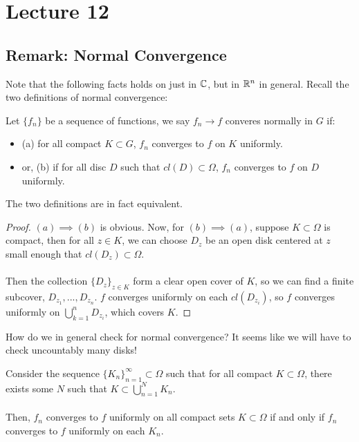 \section{Lecture 12}
\subsection{Remark: Normal Convergence}

Note that the following facts holds on just in $\mathbb{C}$, but in $\mathbb{R}^n$ in general. Recall the two definitions of normal convergence:

\begin{definition}
Let $\{f_n\}$ be a sequence of functions, we say $f_n \to f$ converes normally in $G$ if:
\begin{itemize}
    \item (a) for all compact $K \subset G$, $f_n$ converges to $f$ on $K$ uniformly.
    \item or, (b) if for all disc $D$ such that $cl(D) \subset \Omega$, $f_n$ converges to $f$ on $D$ uniformly.
\end{itemize}
The two definitions are in fact equivalent.
\end{definition}

\begin{proof}
$(a) \implies (b)$ is obvious. Now, for $(b) \implies (a)$, suppose $K \subset \Omega$ is compact, then for all $z \in K$, we can choose $D_z$ be an open disk centered at $z$ small enough that $cl(D_z) \subset \Omega$.\\\\
Then the collection $\{D_z\}_{z \in K}$ form a clear open cover of $K$, so we can find a finite subcover, $D_{z_1}, ..., D_{z_n}$. $f$ converges uniformly on each $cl(D_{z_i})$, so $f$ converges uniformly on $\bigcup_{k = 1}^n D_{z_i}$, which covers $K$.
\end{proof}

How do we in general check for normal convergence? It seems like we will have to check uncountably many disks!

\begin{proposition}
Consider the sequence $\{K_n\}_{n = 1}^\infty \subset \Omega$ such that for all compact $K \subset \Omega$, there exists some $N$ such that $K \subset \bigcup_{n = 1}^N K_n$.\\\\
Then, $f_n$ converges to $f$ uniformly on all compact sets $K \subset \Omega$ if and only if $f_n$ converges to $f$ uniformly on each $K_n$.
\end{proposition}

